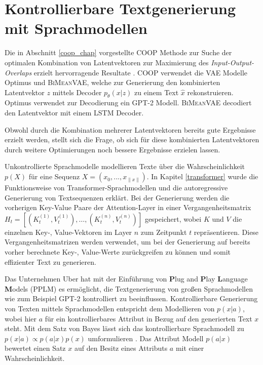 \section{Kontrollierbare Textgenerierung mit Sprachmodellen}\raggedbottom
\label{pplm_chap}
Die in Abschnitt \ref{coop_chap} vorgestellte COOP Methode zur Suche der optimalen Kombination von Latentvektoren zur Maximierung des \textit{Input-Output-Overlaps} erzielt hervorragende Resultate \citep{coop}.
COOP verwendet die VAE Modelle Optimus und \textsc{BiMeanVAE}, welche zur Generierung den kombinierten Latentvektor $z$ mittels Decoder $p_\theta(x|z)$ zu einem Text $\hat{x}$ rekonstruieren.
Optimus verwendet zur Decodierung ein GPT-2 Modell. \textsc{BiMeanVAE} decodiert den Latentvektor mit einem LSTM Decoder.

Obwohl durch die Kombination mehrerer Latentvektoren bereits gute Ergebnisse erzielt werden, stellt sich die Frage, ob sich für diese kombinierten Latentvektoren durch weitere Optimierungen noch bessere Ergebnisse erzielen lassen.

Unkontrollierte Sprachmodelle modellieren Texte über die Wahrscheinlichkeit $p(X)$ für eine Sequenz $X=(x_0,...,x_{\| x \|})$.
In Kapitel \ref{transformer} wurde die Funktionsweise von Transformer-Sprachmodellen und die autoregressive Generierung von Textsequenzen erklärt. 
Bei der Generierung werden die vorherigen Key-Value Paare der Attention-Layer in einer Vergangenheitsmatrix $H_t = [(K_t^{(1)},V_t^{(1)}), \ldots , (K_t^{(n)},V_t^{(n)})]$ gespeichert, wobei $K$ und $V$ die einzelnen Key-, Value-Vektoren im Layer $n$ zum Zeitpunkt $t$ repräsentieren. %
Diese Vergangenheitsmatrizen werden verwendet, um bei der Generierung auf bereits vorher berechnete Key-, Value-Werte zurückgreifen zu können und somit effizienter Text zu generieren.


Das Unternehmen Uber hat mit der Einführung von \textbf{P}lug and \textbf{P}lay \textbf{L}anguage \textbf{M}odels (PPLM) \citep{DBLP:journals/corr/abs-1912-02164} es ermöglicht, die Textgenerierung von großen Sprachmodellen wie zum Beispiel GPT-2 kontrolliert zu beeinflussen.
Kontrollierbare Generierung von Texten mittels Sprachmodellen entspricht dem Modellieren von $p(x|a)$, wobei hier $a$ für ein kontrollierbares Attribut in Bezug auf den generierten Text $x$ steht. 
Mit dem Satz von Bayes lässt sich das kontrollierbare Sprachmodell zu $p(x|a)\propto p(a|x)p(x)$ umformulieren \citep{DBLP:journals/corr/abs-1912-02164}. 
Das Attribut Modell $p(a|x)$ bewertet einen Satz $x$ auf den Besitz eines Attributs $a$ mit einer Wahrscheinlichkeit.


